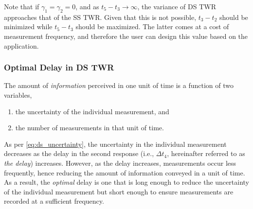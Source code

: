 \documentclass{decar-wsd}    %
\begin{document}
Note that if $\gamma_1 = \gamma_2 = 0$, and as $t_5 - t_3 \rightarrow \infty$, the variance of DS TWR approaches that of the SS TWR. Given that this is not possible, $t_3 - t_2$ should be minimized while $t_5 - t_3$ should be maximized. The latter comes at a cost of measurement frequency, and therefore the user can design this value based on the application.

\subsubsection{Optimal Delay in DS TWR}

The amount of \emph{information} perceived in one unit of time is a function of two variables, 
\begin{enumerate}
    \item the uncertainty of the individual measurement, and
    \item the number of measurements in that unit of time. 
\end{enumerate}
As per \eqref{eq:ds_uncertainty}, the uncertainty in the individual measurement decreases as the delay in the second response (i.e., $\Delta t_4$, hereinafter referred to as \emph{the delay}) increases. However, as the delay increases, measurements occur less frequently, hence reducing the amount of information conveyed in a unit of time. As a result, the \emph{optimal} delay is one that is long enough to reduce the uncertainty of the individual measurement but short enough to ensure measurements are recorded at a sufficient frequency. 
\end{document}
